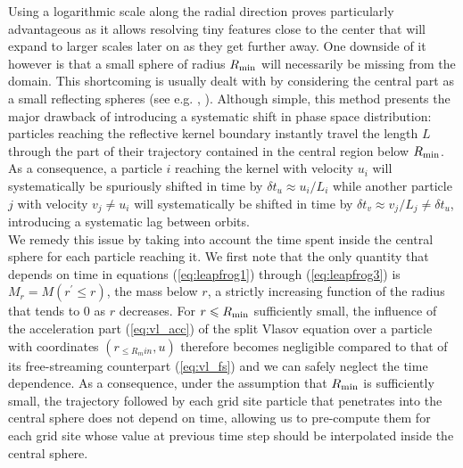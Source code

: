 \documentclass[useAMS,usenatbib]{mn2e}
\begin{document}
Using a logarithmic scale along the radial direction proves particularly advantageous as it allows resolving tiny features close to the center that will expand to larger scales later on as they get further away. One downside of it however is that a small sphere of radius $R_{\rm min}$ will necessarily be missing from the domain. This shortcoming is usually dealt with by considering the central part as a small reflecting spheres (see e.g. \cite {Gott73}, \cite{Fuji83}). Although simple, this method presents the major drawback of introducing a systematic shift in phase space distribution: particles reaching the reflective kernel boundary instantly travel the length $L$ through the part of their trajectory contained in the central region below $R_{\rm min}$. As a consequence, a particle $i$ reaching the kernel with velocity $u_i$ will systematically be spuriously shifted in time by $\delta t_u \approx u_i/L_i$ while another particle $j$ with velocity $v_j \neq u_i$ will systematically be shifted in time by $\delta t_v \approx v_j/L_j \neq \delta t_u$, introducing a systematic lag between orbits.\\

We remedy this issue by taking into account the time spent inside the central sphere for each particle reaching it. We first note that the only quantity that depends on time in equations (\ref{eq:leapfrog1}) through (\ref{eq:leapfrog3}) is $M_r=M\left(r^\prime \leq r\right)$, the mass below $r$, a strictly increasing function of the radius that tends to $0$ as $r$ decreases. For $r\leq R_{\rm min}$ sufficiently small, the influence of the acceleration part (\ref{eq:vl_acc}) of the split Vlasov equation over a particle with coordinates $\left(r_{\leq R_min},u\right)$ therefore becomes negligible compared to that of its free-streaming counterpart (\ref{eq:vl_fs}) and we can safely neglect the time dependence. As a consequence, under the assumption that $R_{\rm min}$ is sufficiently small, the trajectory followed by each grid site particle that penetrates into the central sphere does not depend on time, allowing us to pre-compute them for each grid site whose value at previous time step should be interpolated inside the central sphere.\\
\end{document}
